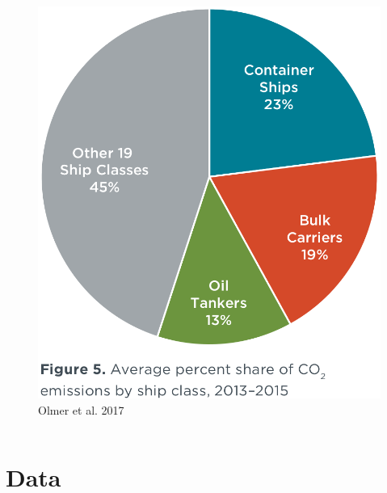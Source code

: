 \documentclass{beamer}
\begin{document}
\begin{frame}
\begin{columns}
\begin{column}{0.5\textwidth}
\begin{figure}
			\includegraphics[width = \textwidth]{ICCT_emissions_ship_type.png}
            \caption{Olmer et al. 2017}
		\end{figure}
	\end{column}
\end{columns}
\end{frame}


\section{Data}

\end{document}
